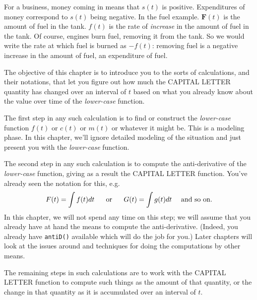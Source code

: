 \documentclass[
  letterpaper,
  DIV=11,
  numbers=noendperiod,
  oneside]{scrreprt}
\begin{document}
For a business, money coming in means that \(s(t)\) is positive.
Expenditures of money correspond to \(s(t)\) being negative. In the fuel
example. \({\mathbf F}(t)\) is the amount of fuel in the tank. \(f(t)\)
is the rate of \emph{increase} in the amount of fuel in the tank. Of
course, engines burn fuel, removing it from the tank. So we would write
the rate at which fuel is burned as \(-f(t)\): removing fuel is a
negative increase in the amount of fuel, an expenditure of fuel.

The objective of this chapter is to introduce you to the sorts of
calculations, and their notations, that let you figure out how much the
CAPITAL LETTER quantity has changed over an interval of \(t\) based on
what you already know about the value over time of the \emph{lower-case}
function.

The first step in any such calculation is to find or construct the
\emph{lower-case} function \(f(t)\) or \(c(t)\) or \(m(t)\) or whatever
it might be. This is a modeling phase. In this chapter, we'll ignore
detailed modeling of the situation and just present you with the
\emph{lower-case} function.

The second step in any such calculation is to compute the
anti-derivative of the \emph{lower-case} function, giving as a result
the CAPITAL LETTER function. You've already seen the notation for this,
e.g.
\[{\Large  F(t) = \int f(t) dt}\ \ \ \ \ \text{or}\ \ \ \ \ {\Large G(t) = \int g(t) dt}\ \ \ \ \text{and so on.}\]
In this chapter, we will not spend any time on this step; we will assume
that you already have at hand the means to compute the anti-derivative.
(Indeed, you already have \texttt{antiD()} available which will do the
job for you.) Later chapters will look at the issues around and
techniques for doing the computations by other means.

The remaining steps in such calculations are to work with the CAPITAL
LETTER function to compute such things as the amount of that quantity,
or the change in that quantity as it is accumulated over an interval of
\(t\).
\end{document}
